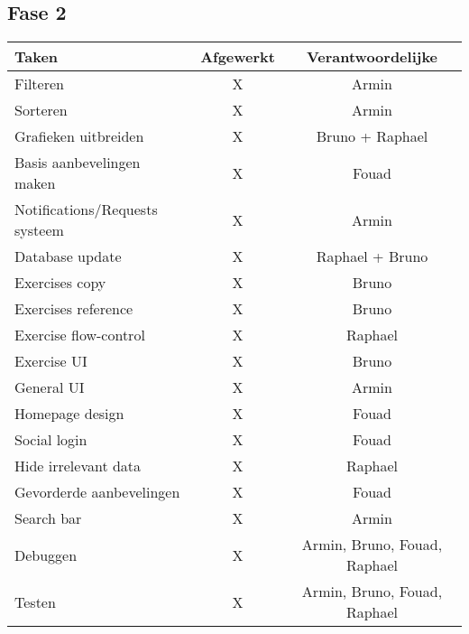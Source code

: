 \subsection{Fase 2}
\begin{tabular}{| l | c | c |}
    \hline
    Taken   &   Afgewerkt   &   Verantwoordelijke \\
    \hline \hline
    Filteren                &   X   &   Armin   \\
    Sorteren                &   X   &   Armin   \\
    Grafieken uitbreiden    &   X   &   Bruno + Raphael \\
    Basis aanbevelingen maken &   X   & Fouad \\
    Notifications/Requests systeem &  X  & Armin \\
    Database update         &   X   &   Raphael + Bruno \\
    Exercises copy          &   X   &   Bruno   \\
    Exercises reference     &   X   &   Bruno   \\
    Exercise flow-control   &   X   &   Raphael \\
    Exercise UI             &   X   &   Bruno   \\
    General UI              &   X   &   Armin   \\
    Homepage design         &   X   &   Fouad   \\
    Social login            &   X   &   Fouad   \\
    Hide irrelevant data    &   X   &   Raphael \\
    Gevorderde aanbevelingen    &   X   &   Fouad   \\
    Search bar              &   X   &   Armin   \\
    \hline
    Debuggen               &   X   &   Armin, Bruno, Fouad, Raphael    \\
    Testen                 &   X   &   Armin, Bruno, Fouad, Raphael    \\
    \hline
\end{tabular}
